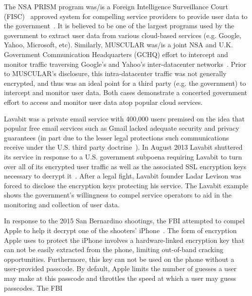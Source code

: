 \begin{packed_desc}
\item[PRISM and MUSCULAR:] The NSA PRISM program was/is a Foreign
  Intelligence Surveillance Court (FISC)~\cite{fisc} approved system
  for compelling service providers to provide user data to the
  government~\cite{greenwald-prism}. It is believed to be one of the
  largest programs used by the government to extract user data from
  various cloud-based services (e.g. Google, Yahoo, Microsoft,
  etc). Similarly, MUSCULAR was/is a joint NSA and U.K. Government
  Communication Headquarters (GCHQ) effort to intercept and monitor
  traffic traversing Google's and Yahoo's inter-datacenter
  networks~\cite{gellman-muscular}. Prior to MUSCULAR's disclosure,
  this intra-datacenter traffic was not generally encrypted, and thus
  was an ideal point for a third party (e.g. the government) to
  intercept and monitor user data. Both cases demonstrate a concerted
  government effort to access and monitor user data atop popular cloud
  services.
\item[Lavabit:] Lavabit was a private email service with 400,000 users
  premised on the idea that popular free email services such as Gmail
  lacked adequate security and privacy guarantees (in part due to the
  lesser legal protections such communications receive under the U.S.
  third party doctrine~\cite{thompson-thirdparty}). In August 2013
  Lavabit shuttered its service in response to a U.S. government
  subpoena requiring Lavabit to turn over all of its encrypted user
  traffic as well as the associated SSL encryption keys necessary to
  decrypt it~\cite{lavabit, levsion-lavabit}. After a legal fight,
  Lavabit founder Ladar Levison was forced to disclose the encryption
  keys protecting his service. The Lavabit example shows the
  government's willingness to compel service operators to aid in the
  monitoring and collection of user data.
\item[Apple v. FBI:] In response to the 2015 San Bernardino shootings,
  the FBI attempted to compel Apple to help it decrypt one of the
  shooters' iPhone~\cite{ars-cookvfbi}. The form of encryption Apple
  uses to protect the iPhone involves a hardware-linked encryption key
  that can not be easily extracted from the phone, limiting
  out-of-band cracking opportunities. Furthermore, this key can not be
  used on the phone without a user-provided passcode. By default,
  Apple limits the number of guesses a user may make at this passcode
  and throttles the speed at which a user may guess passcodes. The FBI

\end{packed_desc}
